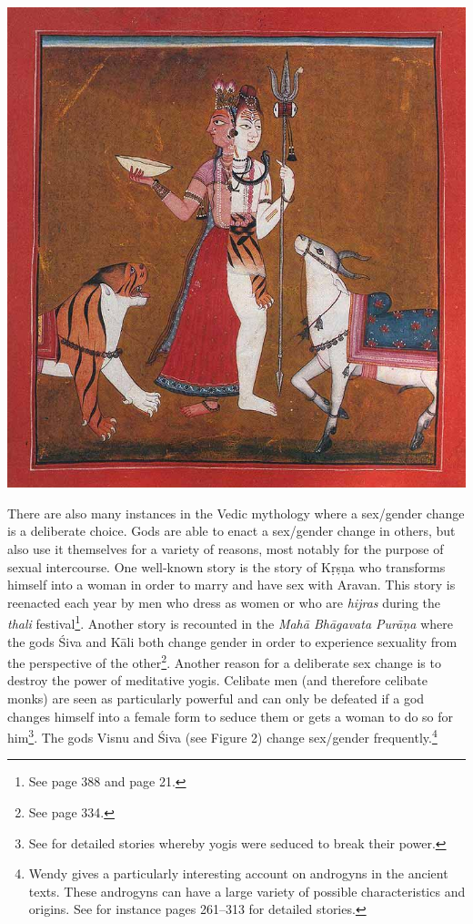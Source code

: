 \bigskip
\includegraphics[width=\textwidth]{androgyne.jpg}
\begin{minipage}{\textwidth}
\end{minipage}
\label{siva}

There are also many instances in the Vedic mythology where a sex/gender change is a deliberate choice. Gods are able to enact a sex/gender change in others, but also use it themselves for a variety of reasons, most notably for the purpose of sexual intercourse. One well-known story is the story of Kṛṣṇa who transforms himself into a woman in order to marry and have sex with Aravan. This story is reenacted each year by men who dress as women or who are {\em hijras} during the {\em thali} festival\footnote{See \cite{goldman} page 388 and \cite{nanda} page 21.}. Another story is recounted in the {\em Mahā Bhāgavata Purāṇa} where the gods Śiva and Kāli both change gender in order to experience sexuality from the perspective of the other\footnote{See \cite{wendy} page 334.}. Another reason for a deliberate sex change is to destroy the power of meditative yogis. Celibate men (and therefore celibate monks) are seen as particularly powerful and can only be defeated if a god changes himself into a female form to seduce them or gets a woman to do so for him\footnote{See \cite{wendy1969} for detailed stories whereby yogis were seduced to break their power.}. The gods Visnu and Śiva (see Figure 2) change sex/gender frequently.\footnote{Wendy \cite{wendy} gives a particularly interesting account on androgyns in the ancient texts. These androgyns can have a large variety of possible characteristics and origins. See for instance pages 261–313 for detailed stories.}

